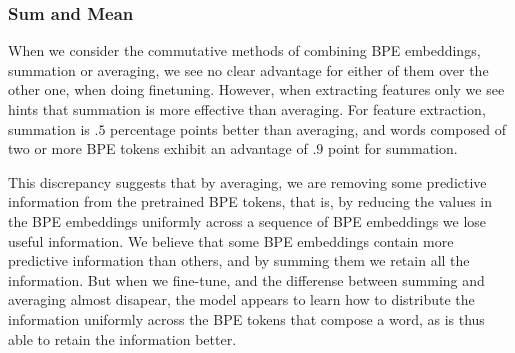 \documentclass[11pt]{article}
\begin{document}
    \subsubsection{Sum and Mean}
                When we consider the commutative methods of combining
     BPE embeddings, summation or averaging, we see no clear advantage
     for either of them over the other one, when doing
     finetuning. However, when extracting features only we see hints
     that summation is more effective than averaging. For feature
     extraction, summation is $.5$ percentage points better than
     averaging, and words composed of two or more BPE tokens exhibit
     an advantage of $.9$ point for summation.
    
                This discrepancy suggests that by averaging, we are
     removing some predictive information from the pretrained BPE
     tokens, that is, by reducing the values in the BPE embeddings
     uniformly across a sequence of BPE embeddings we lose useful
     information.
        We believe that some BPE embeddings contain more predictive
     information than others, and by summing them we retain all the
     information.
             But when we fine-tune, and the differense between summing
     and averaging almost disapear, the model appears to learn how to
     distribute the information uniformly across the BPE tokens that
     compose a word, as is thus able to retain the information better.
    
    


\end{document}
